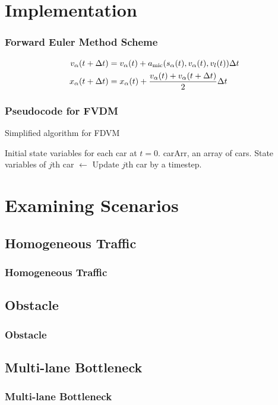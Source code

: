\documentclass{beamer}
\begin{document}
\section{Implementation}
\begin{frame}
  \frametitle{Forward Euler Method Scheme}
  \begin{align*}
    v_\alpha(t+\Delta t) &= v_\alpha(t) +a_{\rm mic}(s_\alpha(t), v_\alpha (t), v_l (t))\Delta t \\
    x_\alpha(t + \Delta t) &= x_\alpha(t) + \frac{v_\alpha (t) + v_\alpha (t+\Delta t)}{2}\Delta t
\end{align*}
\end{frame}

\begin{frame}
  \frametitle{Pseudocode for FVDM}
  \begin{algorithm}
    \caption{Simplified algorithm for FDVM}
    \begin{algorithmic}
    \Require Initial state variables for each car at $t=0$. 
    \Require carArr, an array of cars.
      \State State variables of $j$th car $\gets$ Update $j$th car by a timestep.
      \EndFor
    \EndFor
    \end{algorithmic}
    \end{algorithm}
\end{frame}
\section{Examining Scenarios}

\subsection{Homogeneous Traffic}

\begin{frame}
  \frametitle{Homogeneous Traffic}
\end{frame}

\subsection{Obstacle}

\begin{frame}
  \frametitle{Obstacle}
\end{frame}

\subsection{Multi-lane Bottleneck}

\begin{frame}
  \frametitle{Multi-lane Bottleneck}
\end{frame}
\end{document}
